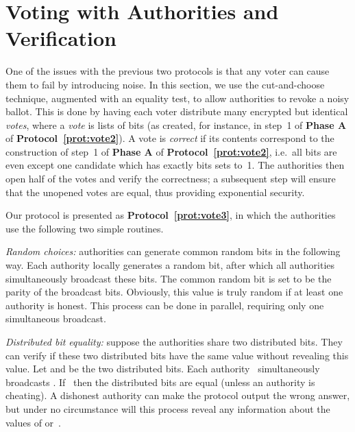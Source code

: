 \documentclass[runningheads]{llncs}
\begin{document}
\section{Voting with Authorities and Verification}
\label{sec:votewithverification}

One of the issues with the previous two protocols is that any voter
can cause them to fail by introducing noise. In this section, we use
the cut-and-choose technique, augmented with an equality test,  to
allow authorities to revoke a noisy ballot. This is done by having
each voter distribute many encrypted but identical \emph{votes},
where a \emph{vote} is  lists of  bits (as created, for
instance, in step~1 of  \textbf{Phase A} of
\textbf{Protocol~\ref{prot:vote2}}). A vote is \emph{correct} if its
contents correspond to the construction of step~1 of \textbf{Phase
A} of \textbf{Protocol~\ref{prot:vote2}}, i.e.~all bits are even
except one candidate which has exactly  bits sets to~1. The
authorities then open half of the votes and verify the correctness;
a subsequent step will ensure that the unopened votes are equal,
thus providing exponential security.

Our protocol is presented as \textbf{Protocol~\ref{prot:vote3}}, in
which the authorities use the following two  simple routines.

\emph{Random choices:} authorities can generate common random bits
in the following way. Each authority locally generates a random bit,
after which all authorities simultaneously broadcast these bits. The
common random bit is set to be the parity of the broadcast bits.
Obviously, this value is truly random if at least one authority is
honest. This process can be done in parallel, requiring only one
simultaneous broadcast.

\emph{Distributed bit equality:} suppose the authorities share two
distributed bits. They can verify if these two distributed bits have
the same value without revealing this value. Let
 and  be the two
distributed bits. Each authority~ simultaneously broadcasts
. If~ then the
distributed bits are equal (unless an authority is cheating). A
dishonest authority can make the protocol output the wrong answer,
but under no circumstance will  this process reveal any information
about the values of  or~.
\end{document}
